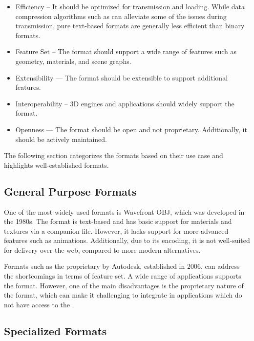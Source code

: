 \begin{itemize}
  \item{Efficiency} – It should be optimized for transmission and loading. While data compression algorithms such as  can alleviate some of the issues during transmission, pure text-based formats are generally less efficient than binary formats.
  \item{Feature Set} – The format should support a wide range of features such as geometry, materials, and scene graphs.
  \item{Extensibility} — The format should be extensible to support additional features.
  \item{Interoperability} – 3D engines and applications should widely support the format.
  \item{Openness} — The format should be open and not proprietary. Additionally, it should be actively maintained.
\end{itemize}

The following section categorizes the formats based on their use case and highlights well-established formats.

\subsection*{General Purpose Formats}

One of the most widely used formats is Wavefront \gls{OBJ}, which was developed in the 1980s. The format is text-based and has basic support for materials and textures via a companion  file. However, it lacks support for more advanced features such as animations. Additionally, due to its encoding, it is not well-suited for delivery over the web, compared to more modern alternatives.

Formats such as the proprietary  by Autodesk, established in 2006, can address the shortcomings in terms of feature set. A wide range of applications supports the format. However, one of the main disadvantages is the proprietary nature of the format, which can make it challenging to integrate in applications which do not have access to the .

\subsection*{Specialized Formats}
\label{ch:specializedFormats}

